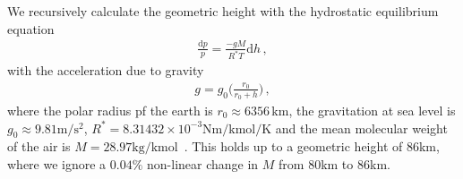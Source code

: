 We recursively calculate the geometric height with the hydrostatic equilibrium equation
\begin{align}
	\frac{\text{d}p}{p} = \frac{- g M}{R^* T} \text{d} h \, ,\label{eq:hydr}
\end{align}
with the acceleration due to gravity
\begin{align}
	g = g_0 \Bigg( \frac{r_0}{r_0 + h} \Bigg) \, ,
\end{align}
where the polar radius pf the earth is $r_0 \approx 6356 \, \text{km}$, the gravitation at sea level is $g_0 \approx 9.81 \text{m}/\text{s}^2$, $R^* = 8.31432 \times 10^{-3} \text{Nm} / \text{kmol} / \text{K}$ and the mean molecular weight of the air is $M = 28.97 \text{kg/kmol}$~\cite{atmosphere1976us}.
This holds up to a geometric height of $86$km, where we ignore a $0.04\%$ non-linear change in $M$ from $80$km to $86$km.

